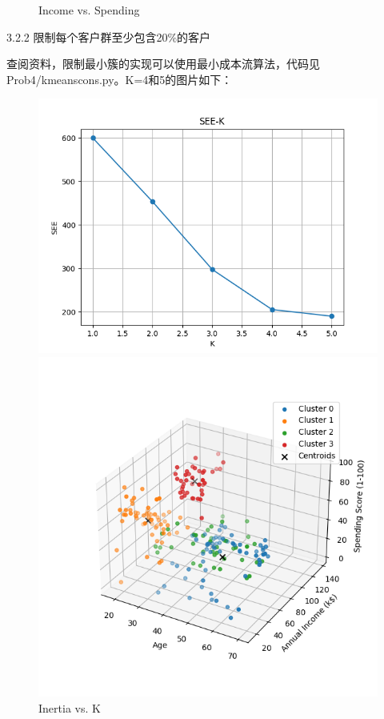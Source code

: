 \documentclass[8pt]{article}
\begin{document}
\begin{figure}[H]
\begin{minipage}{0.32\textwidth}
        \caption{Income vs. Spending}
        \label{fig: Annual Income vs. Spending Score k6 com con w}
    \end{minipage}
    \hfill
\end{figure}

3.2.2 限制每个客户群至少包含20\%的客户

查阅资料，限制最小簇的实现可以使用最小成本流算法，代码见 {\color{blue}Prob4/kmeans\text{\_}cons.py}。K=4和5的图片如下：

\begin{figure}[H]
    \centering
    \begin{minipage}{0.32\textwidth}
        \centering
        \includegraphics[width=\textwidth]{./Prob4/out/task3_2_com/SEE-K.png}
        \caption{Inertia vs. K}
        \label{fig: Inertia vs. K com min20 2}
    \end{minipage}
    \hfill
    \begin{minipage}{0.32\textwidth}
        \centering
        \includegraphics[width=\textwidth]{./Prob4/out/task3_2_com/images/cluster_result_k4_3d.png}

\end{minipage}
\end{figure}
\end{document}
